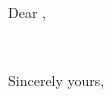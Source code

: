\documentclass[12pt]{letter}
\begin{document}
\begin{letter}{ %
  \\
  \\
  \\
  }

\opening{Dear ,}



\closing{Sincerely yours,}
\end{letter}
\end{document}
